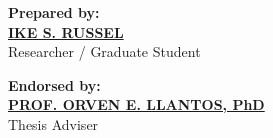 \documentclass[10pt,a4paper]{article}
\begin{document}
\noindent
\begin{minipage}[t]{0.45\textwidth}
    \textbf{Prepared by:}\\[1.6cm]
    \textbf{\underline{IKE S. RUSSEL}}\\[2pt]
    Researcher / Graduate Student
\end{minipage}
\hfill
\begin{minipage}[t]{0.45\textwidth}
    \textbf{Endorsed by:}\\[1.6cm]
    \textbf{\underline{PROF. ORVEN E. LLANTOS, PhD}}\\[2pt]
    Thesis Adviser
\end{minipage}
\end{document}
